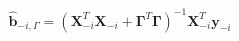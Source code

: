 \documentclass[10pt]{article}
\begin{document}
\begin{align*}\boldsymbol{\hat{b}}_{-i,\Gamma} = \left( \boldsymbol X_{-i}^T \boldsymbol X_{-i} + \boldsymbol \Gamma^T \boldsymbol \Gamma \right)^{-1}
\boldsymbol X_{-i}^T \boldsymbol y_{-i}\end{align*}
\end{document}
